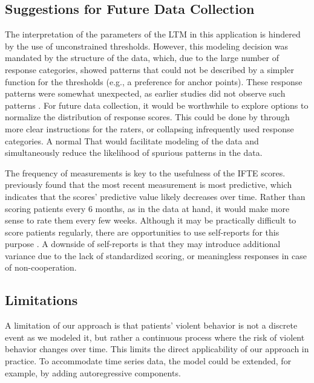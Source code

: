 \documentclass[a4paper,11pt]{article}
\begin{document}
\subsection{Suggestions for Future Data Collection}

The interpretation of the parameters of the LTM in this application is hindered by the use of unconstrained thresholds.
However, this modeling decision was mandated by the structure of the data, which, due to the large number of response categories, showed patterns that could not be described by a simpler function for the thresholds (e.g., a preference for anchor points).
These response patterns were somewhat unexpected, as earlier studies did not observe such patterns \parencite[e.g., see Figure 2 of ][]{schuringa2014inter}.
For future data collection, it would be worthwhile to explore options to normalize the distribution of response scores.
This could be done by through more clear instructions for the raters, or collapsing infrequently used response categories.
A normal That would facilitate modeling of the data and simultaneously reduce the likelihood of spurious patterns in the data.

The frequency of measurements is key to the usefulness of the IFTE scores.
\textcite{schuringa2019inpatient} previously found that the most recent measurement is most predictive, which indicates that the scores' predictive value likely decreases over time.
Rather than scoring patients every 6 months, as in the data at hand, it would make more sense to rate them every few weeks.
Although it may be practically difficult to score patients regularly, there are opportunities to use self-reports for this purpose \parencite{tuente2021mapping, bousardt2016predicting}.
A downside of self-reports is that they may introduce additional variance due to the lack of standardized scoring, or meaningless responses in case of non-cooperation.

\subsection{Limitations}
A limitation of our approach is that patients' violent behavior is not a discrete event as we modeled it, but rather a continuous process where the risk of violent behavior changes over time.
This limits the direct applicability of our approach in practice.
To accommodate time series data, the model could be extended, for example, by adding autoregressive components.
\end{document}
